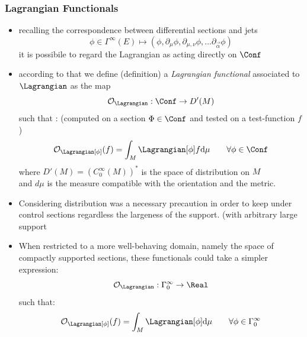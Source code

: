 \documentclass[a4paper,11pt]{scrartcl}
\begin{document}
    \subsubsection*{Lagrangian Functionals}
    \begin{itemize}
        \item recalling the correspondence between differential sections and jets
        $$ \phi \in \Gamma^\infty (E) \mapsto (\phi, \partial_\mu \phi, \partial_{\mu, \nu} \phi , \ldots \partial_{\vec{\alpha}}\phi) $$
        it is possibile to regard the Lagrangian as acting directly on $\Conf$
        \item according to that we define (definition) a \emph{Lagrangian functional} associated to $\Lagrangian$ as the map
        $$ \mathcal{O}_\Lagrangian : \Conf \rightarrow D'(M)  $$
        such that : (computed on a section $\Phi\in \Conf$ and tested on a test-function $f$)
        $$ \mathcal{O}_\Lagrangian [\phi] (f) = \int_M \Lagrangian [\phi] f \textrm{d}\mu \qquad \forall \phi \in \Conf $$
        where $D'(M)= \left(C^\infty_0(M)\right)^*$ is the space of distribution on $M$\\
        and $d\mu$ is the measure compatible with the orientation and the metric.
        \item Considering distribution was a necessary precaution in order to keep under control sections regardless the largeness of the support. (with arbitrary large support
        \item When restricted to a more well-behaving domain, namely the space of compactly supported sections, these functionals could take a simpler expression:
        $$ \mathcal{O}_\Lagrangian : \Gamma_0^\infty \rightarrow \Real  $$
        such that:
        $$ \mathcal{O}_\Lagrangian [\phi] (f) = \int_M \Lagrangian [\phi] \textrm{d}\mu  \qquad \forall \phi \in  \Gamma_0^\infty  $$
    \end{itemize}
\end{document}

